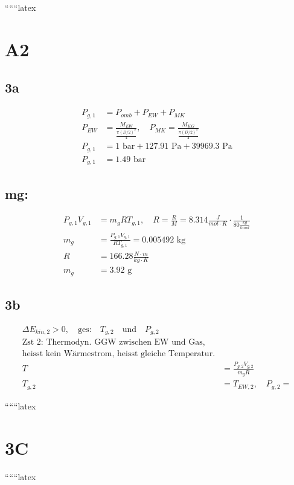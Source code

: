 
``````latex


\section*{A2}

\subsection*{3a}
\begin{align*}
P_{g,1} &= P_{omb} + P_{EW} + P_{MK} \\
P_{EW} &= \frac{M_{EW}}{\frac{\pi (D/2)^2}{4}}, \quad P_{MK} = \frac{M_{KG}}{\frac{\pi (D/2)^2}{4}} \\
P_{g,1} &= 1 \text{ bar} + 127.91 \text{ Pa} + 39969.3 \text{ Pa} \\
P_{g,1} &= 1.49 \text{ bar}
\end{align*}

\subsection*{mg:}
\begin{align*}
P_{g,1} V_{g,1} &= m_{g} R T_{g,1}, \quad R = \frac{R}{M} = 8.314 \frac{J}{mol \cdot K} \cdot \frac{1}{80 \frac{kg}{kmol}} \\
m_{g} &= \frac{P_{g,1} V_{g,1}}{R T_{g,1}} = 0.005492 \text{ kg} \\
R &= 166.28 \frac{N \cdot m}{kg \cdot K} \\
m_{g} &= 3.92 \text{ g}
\end{align*}

\subsection*{3b}
\begin{align*}
\Delta E_{kin,2} > 0, \quad \text{ges:} \quad T_{g,2} \quad \text{und} \quad P_{g,2} \\
\text{Zst 2: Thermodyn. GGW zwischen EW und Gas,} \\
\text{heisst kein Wärmestrom, heisst gleiche Temperatur.} \\
T &= \frac{P_{g,2} V_{g,2}}{m_{g} R} \\
T_{g,2} &= T_{EW,2}, \quad P_{g,2} = 
\end{align*}

``````latex


\section*{3C}

``````latex


